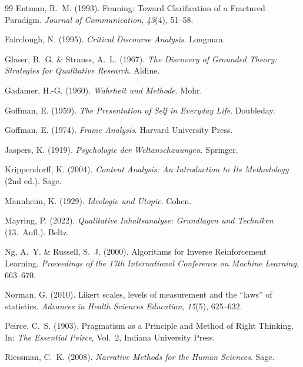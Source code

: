 \documentclass[11pt,a4paper]{article}
\theoremstyle{definition}
\theoremstyle{plain}
\theoremstyle{remark}
\begin{document}
\begin{thebibliography}{99}
  Entman, R.~M. (1993).
  Framing: Toward Clarification of a Fractured Paradigm.
  \textit{Journal of Communication}, \textit{43}(4), 51--58.

  Fairclough, N. (1995).
  \textit{Critical Discourse Analysis}.
  Longman.

  Glaser, B.~G. \& Strauss, A.~L. (1967).
  \textit{The Discovery of Grounded Theory: Strategies for Qualitative Research}.
  Aldine.

  Gadamer, H.-G. (1960).
  \textit{Wahrheit und Methode}.
  Mohr.

  Goffman, E. (1959).
  \textit{The Presentation of Self in Everyday Life}.
  Doubleday.

  Goffman, E. (1974).
  \textit{Frame Analysis}.
  Harvard University Press.

  Jaspers, K. (1919).
  \textit{Psychologie der Weltanschauungen}.
  Springer.

  Krippendorff, K. (2004).
  \textit{Content Analysis: An Introduction to Its Methodology} (2nd ed.).
  Sage.

  Mannheim, K. (1929).
  \textit{Ideologie und Utopie}.
  Cohen.

  Mayring, P. (2022).
  \textit{Qualitative Inhaltsanalyse: Grundlagen und Techniken} (13.\ Aufl.).
  Beltz.

  Ng, A.~Y. \& Russell, S.~J. (2000).
  Algorithms for Inverse Reinforcement Learning.
  \textit{Proceedings of the 17th International Conference on Machine Learning}, 663--670.

  Norman, G. (2010).
  Likert scales, levels of measurement and the ``laws'' of statistics.
  \textit{Advances in Health Sciences Education}, \textit{15}(5), 625--632.

  Peirce, C.~S. (1903).
  Pragmatism as a Principle and Method of Right Thinking.
  In: \textit{The Essential Peirce}, Vol.~2, Indiana University Press.

  Riessman, C.~K. (2008).
  \textit{Narrative Methods for the Human Sciences}.
  Sage.


\end{thebibliography}
\end{document}
